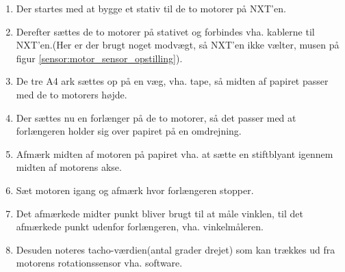 \begin{enumerate}
\item Der startes med at bygge et stativ til de to motorer på NXT'en.
\item Derefter sættes de to motorer på stativet og forbindes vha. kablerne til NXT'en.(Her er der brugt noget modvægt, så NXT'en ikke vælter, musen på figur \ref{sensor:motor_sensor_opstilling}).
\item De tre A4 ark sættes op på en væg, vha. tape, så midten af papiret passer med de to motorers højde.
\item Der sættes nu en forlænger på de to motorer, så det passer med at forlængeren holder sig over papiret på en omdrejning.
\item Afmærk midten af motoren på papiret vha. at sætte en stiftblyant igennem midten af motorens akse.
\item Sæt motoren igang og afmærk hvor forlængeren stopper.
\item Det afmærkede midter punkt bliver brugt til at måle vinklen, til det afmærkede punkt udenfor forlængeren, vha. vinkelmåleren.
\item Desuden noteres tacho-værdien(antal grader drejet) som kan trækkes ud fra motorens rotationssensor vha. software.
\end{enumerate}


